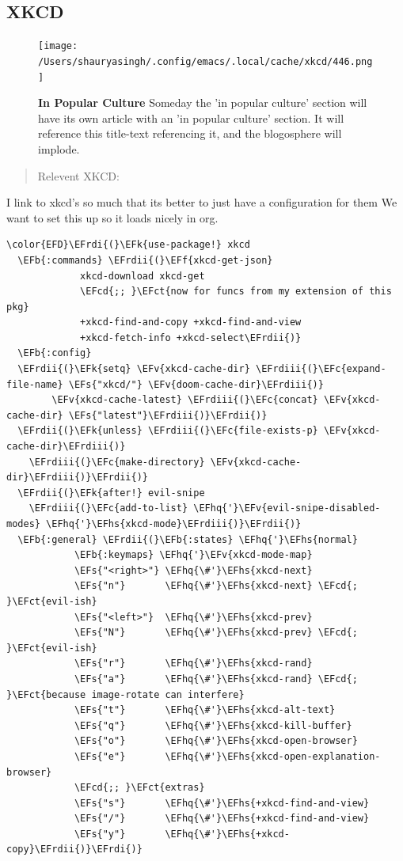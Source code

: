 \documentclass{scrartcl}
\newcommand{\EFk}[1]{\textcolor{EFk}{#1}} %
\newcommand{\EFs}[1]{\textcolor{EFs}{#1}} %
\newcommand{\EFb}[1]{\textcolor{EFb}{#1}} %
\newcommand{\EFct}[1]{\textcolor{EFct}{#1}} %
\newcommand{\EFc}[1]{\textcolor{EFc}{#1}} %
\newcommand{\EFv}[1]{\textcolor{EFv}{#1}} %
\newcommand{\EFf}[1]{\textcolor{EFf}{#1}} %
\newcommand{\EFcd}[1]{\textcolor{EFcd}{#1}} %
\newcommand{\EFhq}[1]{#1} %
\newcommand{\EFhs}[1]{#1} %
\newcommand{\EFrdi}[1]{#1} %
\newcommand{\EFrdii}[1]{#1} %
\newcommand{\EFrdiii}[1]{#1} %
\begin{document}
\subsection{XKCD}
\label{sec:orgcfdde64}
\begin{figure}[!htb]
    \centering
    \texttt{[image: /Users/shauryasingh/.config/emacs/.local/cache/xkcd/446.png]}
  \caption*{\label{xkcd:446} \textbf{In Popular Culture} Someday the 'in popular culture' section will have its own article with an 'in popular culture' section.  It will reference this title-text referencing it, and the blogosphere will implode.}
  \end{figure}

\begin{quote}
Relevent XKCD:
\end{quote}

I link to xkcd's so much that its better to just have a configuration for them
We want to set this up so it loads nicely in org.
\begin{Code}
\begin{Verbatim}[]
\color{EFD}\EFrdi{(}\EFk{use-package!} xkcd
  \EFb{:commands} \EFrdii{(}\EFf{xkcd-get-json}
             xkcd-download xkcd-get
             \EFcd{;; }\EFct{now for funcs from my extension of this pkg}
             +xkcd-find-and-copy +xkcd-find-and-view
             +xkcd-fetch-info +xkcd-select\EFrdii{)}
  \EFb{:config}
  \EFrdii{(}\EFk{setq} \EFv{xkcd-cache-dir} \EFrdiii{(}\EFc{expand-file-name} \EFs{"xkcd/"} \EFv{doom-cache-dir}\EFrdiii{)}
        \EFv{xkcd-cache-latest} \EFrdiii{(}\EFc{concat} \EFv{xkcd-cache-dir} \EFs{"latest"}\EFrdiii{)}\EFrdii{)}
  \EFrdii{(}\EFk{unless} \EFrdiii{(}\EFc{file-exists-p} \EFv{xkcd-cache-dir}\EFrdiii{)}
    \EFrdiii{(}\EFc{make-directory} \EFv{xkcd-cache-dir}\EFrdiii{)}\EFrdii{)}
  \EFrdii{(}\EFk{after!} evil-snipe
    \EFrdiii{(}\EFc{add-to-list} \EFhq{'}\EFv{evil-snipe-disabled-modes} \EFhq{'}\EFhs{xkcd-mode}\EFrdiii{)}\EFrdii{)}
  \EFb{:general} \EFrdii{(}\EFb{:states} \EFhq{'}\EFhs{normal}
            \EFb{:keymaps} \EFhq{'}\EFv{xkcd-mode-map}
            \EFs{"<right>"} \EFhq{\#'}\EFhs{xkcd-next}
            \EFs{"n"}       \EFhq{\#'}\EFhs{xkcd-next} \EFcd{; }\EFct{evil-ish}
            \EFs{"<left>"}  \EFhq{\#'}\EFhs{xkcd-prev}
            \EFs{"N"}       \EFhq{\#'}\EFhs{xkcd-prev} \EFcd{; }\EFct{evil-ish}
            \EFs{"r"}       \EFhq{\#'}\EFhs{xkcd-rand}
            \EFs{"a"}       \EFhq{\#'}\EFhs{xkcd-rand} \EFcd{; }\EFct{because image-rotate can interfere}
            \EFs{"t"}       \EFhq{\#'}\EFhs{xkcd-alt-text}
            \EFs{"q"}       \EFhq{\#'}\EFhs{xkcd-kill-buffer}
            \EFs{"o"}       \EFhq{\#'}\EFhs{xkcd-open-browser}
            \EFs{"e"}       \EFhq{\#'}\EFhs{xkcd-open-explanation-browser}
            \EFcd{;; }\EFct{extras}
            \EFs{"s"}       \EFhq{\#'}\EFhs{+xkcd-find-and-view}
            \EFs{"/"}       \EFhq{\#'}\EFhs{+xkcd-find-and-view}
            \EFs{"y"}       \EFhq{\#'}\EFhs{+xkcd-copy}\EFrdii{)}\EFrdi{)}
\end{Verbatim}
\end{Code}
\end{document}
